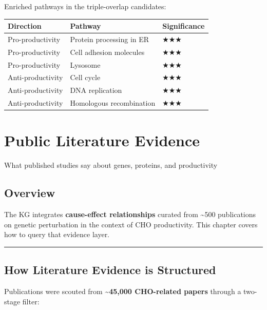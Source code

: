 \documentclass[
  letterpaper,
  oneside,
  open=any]{scrbook}
\newcounter{none} %
\begin{document}
Enriched pathways in the triple-overlap candidates:

{\def\LTcaptype{none} %
\begin{longtable}[]{@{}lll@{}}
\toprule\noalign{}
Direction & Pathway & Significance \\
\midrule\noalign{}
\endhead
\bottomrule\noalign{}
\endlastfoot
Pro-productivity & Protein processing in ER & ★★★ \\
Pro-productivity & Cell adhesion molecules & ★★★ \\
Pro-productivity & Lysosome & ★★★ \\
Anti-productivity & Cell cycle & ★★★ \\
Anti-productivity & DNA replication & ★★★ \\
Anti-productivity & Homologous recombination & ★★★ \\
\end{longtable}
}


\chapter{Public Literature Evidence}\label{public-literature-evidence}

What published studies say about genes, proteins, and productivity

\hfill\break

\section{Overview}\label{sec-literature}

The KG integrates \textbf{cause-effect relationships} curated from
\textasciitilde500 publications on genetic perturbation in the context
of CHO productivity. This chapter covers how to query that evidence
layer.

\begin{center}\rule{0.5\linewidth}{0.5pt}\end{center}

\section{How Literature Evidence is
Structured}\label{how-literature-evidence-is-structured}

Publications were scouted from \textbf{\textasciitilde45,000 CHO-related
papers} through a two-stage filter:
\end{document}
